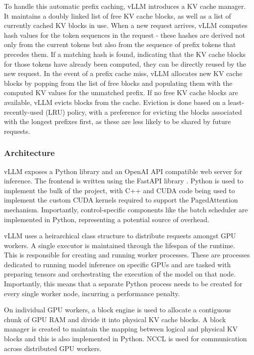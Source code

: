 \documentclass[12pt,twoside]{report}
\begin{document}
To handle this automatic prefix caching, vLLM introduces a KV cache manager.
It maintains a doubly linked list of free KV cache blocks, as well as a list of currently cached KV blocks in use.
When a new request arrives, vLLM computes hash values for the token sequences in the request - these hashes are derived not only from the current tokens but also from the sequence of prefix tokens that precedes them. 
If a matching hash is found, indicating that the KV cache blocks for those tokens have already been computed, they can be directly reused by the new request.
In the event of a prefix cache miss, vLLM allocates new KV cache blocks by popping from the list of free blocks and populating them with the computed KV values for the unmatched prefix.
If no free KV cache blocks are available, vLLM evicts blocks from the cache. 
Eviction is done based on a least-recently-used (LRU) policy, with a preference for evicting the blocks associated with the longest prefixes first, as these are less likely to be shared by future requests.


\subsubsection{Architecture}
vLLM exposes a Python library and an OpenAI API \cite{openaiapi} compatible web server for inference.
The frontend is written using the FastAPI library \cite{fastapi}.
Python is used to implement the bulk of the project, with C++ and CUDA code being used to implement the custom CUDA kernels required to support the PagedAttention mechanism.
Importantly, control-specific components like the batch scheduler are implemented in Python, representing a potential source of overhead.

vLLM uses a heirarchical class structure to distribute requests amongst GPU workers.
A single executor is maintained through the lifespan of the runtime.
This is responsible for creating and running worker processes.
These are processes dedicated to running model inference on specific GPUs and are tasked with preparing tensors and orchestrating the execution of the model on that node. 
Importantly, this means that a separate Python process needs to be created for every single worker node, incurring a performance penalty.

On individual GPU workers, a block engine is used to allocate a contiguous chunk of GPU RAM and divide it into physical KV cache blocks.
A block manager is created to maintain the mapping between logical and physical KV blocks and this is also implemented in Python. 
NCCL \cite{nccl} is used for communication across distributed GPU workers.
\end{document}

